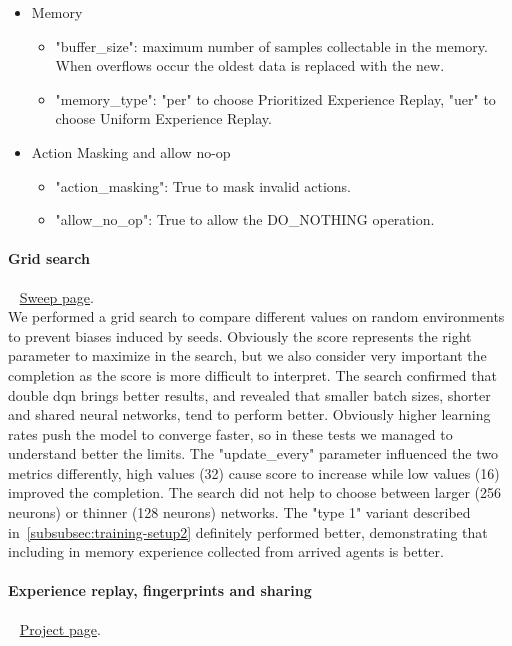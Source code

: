 \documentclass[11pt, a4paper, hidelinks]{report}
\begin{document}
\begin{itemize}
\begin{itemize}
	\end{itemize}
	\item Memory
	\begin{itemize}
		\item "buffer\_size": maximum number of samples collectable in the memory.
When overflows occur the oldest data is replaced with the new.
		\item "memory\_type": "per" to choose Prioritized Experience Replay, "uer" to choose Uniform Experience Replay.
	\end{itemize}
	\item Action Masking and allow no-op
	\begin{itemize}
		\item "action\_masking": True to mask invalid actions.
		\item "allow\_no\_op": True to allow the DO\_NOTHING operation.
	\end{itemize}
\end{itemize}

\paragraph{Grid search}\label{par:d3qn_grid_search}
~\newline
\href{https://app.wandb.ai/fiorenzoparascandolo/flatland-challenge-d3qn}{Sweep page}.\\

We performed a grid search to compare different values on random environments to prevent biases induced by seeds.
Obviously the score represents the right parameter to maximize in the search, but we also consider very important the completion as the score is more difficult to interpret.
The search confirmed that double dqn brings better results, and revealed that smaller batch sizes, shorter and shared neural networks, tend to perform better.
Obviously higher learning rates push the model to converge faster, so in these tests we managed to understand better the limits.
The "update\_every" parameter influenced the two metrics differently, high values (32) cause score to increase while low values (16) improved the completion.
The search did not help to choose between larger (256 neurons) or thinner (128 neurons) networks.
The "type 1" variant described in~\ref{subsubsec:training-setup2} definitely performed better, demonstrating that including in memory experience collected from arrived agents is better.

\paragraph{Experience replay, fingerprints and sharing}\label{par:d3qn_er_fp_ps}
~\newline
\href{https://app.wandb.ai/lomb/flatland-challenge-d3qn-er}{Project page}.\\
\end{document}
